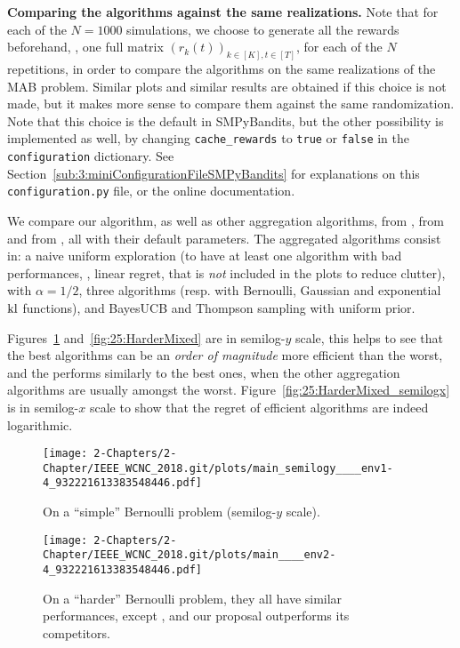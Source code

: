 \textbf{Comparing the algorithms against the same realizations.}
%
Note that for each of the $N=1000$ simulations, we choose to generate all the rewards beforehand, \ie, one full matrix $(r_k(t))_{k\in[K], t\in[T]}$, for each of the $N$ repetitions, in order to compare the algorithms on the same realizations of the MAB problem.
%
Similar plots and similar results are obtained if this choice is not made, but it makes more sense to compare them against the same randomization. Note that this choice is the default in SMPyBandits, but the other possibility is implemented as well, by changing \texttt{cache\_rewards} to \texttt{true} or \texttt{false} in the \texttt{configuration} dictionary. See Section~\ref{sub:3:miniConfigurationFileSMPyBandits} for explanations on this \texttt{configuration.py} file, or the online documentation.

We compare our \Aggr{} algorithm,
as well as other aggregation algorithms, \ExpQ{} from \cite{Bubeck12},
\CORRAL{} from \cite{Agarwal16} and \LearnExp{} from \cite{Singla17}, all with their default parameters.
%
The aggregated algorithms consist in:
a naive uniform exploration (to have at least one algorithm with bad performances, \ie, linear regret, that is \emph{not} included in the plots to reduce clutter),
\UCB{} with $\alpha=1/2$, three \klUCB{} algorithms (resp. with Bernoulli, Gaussian and exponential $\mathrm{kl}$ functions), and BayesUCB and Thompson sampling with uniform prior.

Figures~\ref{fig:25:EasyBernoulli} and~\ref{fig:25:HarderMixed} are in semilog-$y$ scale, this helps to see that the best algorithms can be an \emph{order of magnitude} more efficient than the worst, and the \Aggr{} performs similarly to the best ones, when the other aggregation algorithms are usually amongst the worst.
Figure~\ref{fig:25:HarderMixed_semilogx} is in semilog-$x$ scale to show that the regret of efficient algorithms are indeed logarithmic.


\begin{figure}[h!]  %
	\centering
	\texttt{[image: 2-Chapters/2-Chapter/IEEE\_WCNC\_2018.git/plots/main\_semilogy\_\_\_\_env1-4\_932221613383548446.pdf]}
	\caption{On a ``simple'' Bernoulli problem (semilog-$y$ scale).}
	\label{fig:25:EasyBernoulli}
\end{figure}

\begin{figure}[h!]  %
	\centering
	\texttt{[image: 2-Chapters/2-Chapter/IEEE\_WCNC\_2018.git/plots/main\_\_\_\_env2-4\_932221613383548446.pdf]}
	\caption{On a ``harder'' Bernoulli problem, they all have similar performances, except \LearnExp, and our proposal \Aggr{} outperforms its competitors.}
	\label{fig:25:HardBernoulli}
\end{figure}

